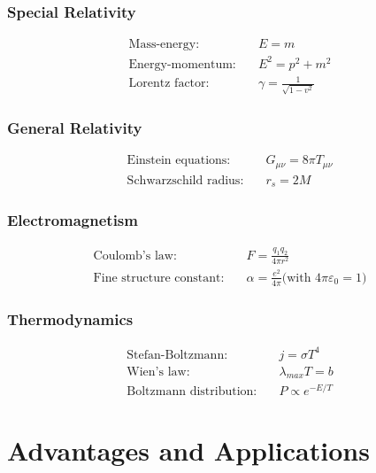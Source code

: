 \documentclass[11pt,a4paper]{article}
\begin{document}
	\subsubsection{Special Relativity}
	\begin{align}
		\text{Mass-energy:} \quad & E = m \\
		\text{Energy-momentum:} \quad & E^2 = p^2 + m^2 \\
		\text{Lorentz factor:} \quad & \gamma = \frac{1}{\sqrt{1-v^2}}
	\end{align}
	
	\subsubsection{General Relativity}
	\begin{align}
		\text{Einstein equations:} \quad & G_{\mu\nu} = 8\pi T_{\mu\nu} \\
		\text{Schwarzschild radius:} \quad & r_s = 2M
	\end{align}
	
	\subsubsection{Electromagnetism}
	\begin{align}
		\text{Coulomb's law:} \quad & F = \frac{q_1 q_2}{4\pi r^2} \\
		\text{Fine structure constant:} \quad & \alpha = \frac{e^2}{4\pi}
		\text{(with } 4\pi\varepsilon_0 = 1\text{)}
	\end{align}
	
	\subsubsection{Thermodynamics}
	\begin{align}
		\text{Stefan-Boltzmann:} \quad & j = \sigma T^4 \\
		\text{Wien's law:} \quad & \lambda_{max} T = b \\
		\text{Boltzmann distribution:} \quad & P \propto e^{-E/T}
	\end{align}
	
	\section{Advantages and Applications}
	
\end{document}
